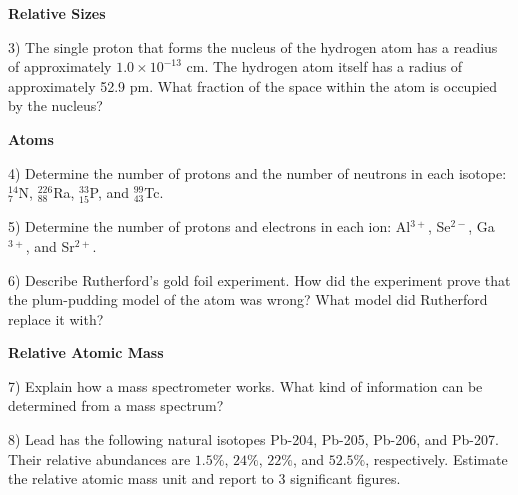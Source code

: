 \documentclass[12pt]{article}
\begin{document}
\textbf{Relative Sizes}

3) The single proton that forms the nucleus of the hydrogen atom has
a readius of approximately $1.0\times 10^{-13}$ cm. The hydrogen atom itself
has a radius of approximately 52.9 pm. What fraction of the space within
the atom is occupied by the nucleus?

\vspace{0.7in}

\textbf{Atoms}

4) Determine the number of protons and the number of neutrons in each isotope:
$^{14}_7$N, $^{226}_{88}$Ra, $^{33}_{15}$P, and $^{99}_{43}$Tc.

\vspace{0.4in}

5) Determine the number of protons and electrons in each ion: Al$^{3+}$, Se$^{2-}$,
Ga$^{3+}$, and Sr$^{2+}$.

\vspace{0.4in}

6) Describe Rutherford's gold foil experiment. How did the experiment prove
that the plum-pudding model of the atom was wrong? What model did Rutherford
replace it with?

\vspace{0.7in}

\textbf{Relative Atomic Mass}

7) Explain how a mass spectrometer works. What kind of information can be
determined from a mass spectrum?

\vspace{0.7in}

8) Lead has the following natural isotopes Pb-204, Pb-205, Pb-206, and Pb-207.
Their relative abundances are $1.5\%$, $24\%$, $22\%$, and $52.5\%$, respectively.
Estimate the relative atomic mass unit and report to 3 significant figures.

\vfill
\end{document}
